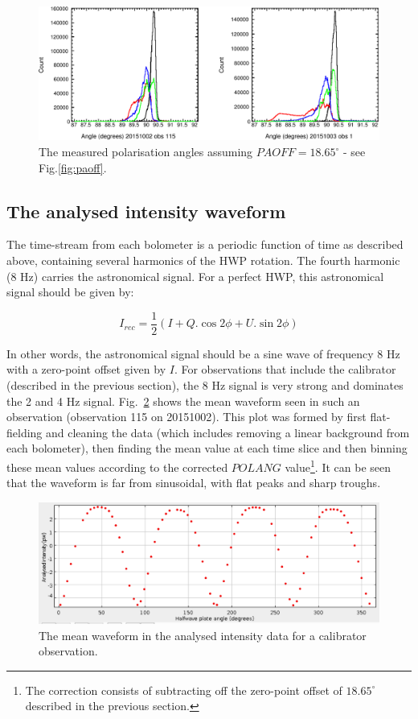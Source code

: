 \documentclass[twoside,11pt]{starlink}
\begin{document}
\begin{figure}
\includegraphics[width=\columnwidth]{paoff2}
\caption{The measured polarisation angles assuming $PAOFF=18.65^\circ$
- see Fig.\ref{fig:paoff}.}
\label{fig:paoff2}
\end{figure}

\subsection{The analysed intensity waveform}
\label{sec:wave}
The time-stream from each bolometer is a periodic function of time as
described above, containing several harmonics of the HWP rotation. The
fourth harmonic (8 Hz) carries the astronomical signal. For a perfect
HWP, this astronomical signal should be given by:

\[ I_{rec} = \frac{1}{2}( I + Q.\cos 2\phi + U.\sin 2\phi ) \]

In other words, the astronomical signal should be a sine wave of
frequency 8 Hz with a zero-point offset given by $I$. For observations
that include the calibrator (described in the previous section), the 8 Hz
signal is very strong and dominates the 2 and 4 Hz signal.
Fig.~\ref{fig:calib-wave} shows the mean waveform seen in such an
observation (observation 115 on 20151002). This plot was formed by
first flat-fielding and cleaning the data (which includes removing a
linear background from each bolometer), then finding the mean value
at each time slice and then binning these mean values according to
the corrected $POLANG$ value\footnote{The correction consists of
subtracting off the zero-point offset of $18.65^\circ$ described
in the previous section.}. It can be seen that the waveform is far
from sinusoidal, with flat peaks and sharp troughs.

\begin{figure}
\includegraphics[width=\columnwidth]{calib-wave}
\caption{The mean waveform in the analysed intensity data for a
calibrator observation.}
\label{fig:calib-wave}
\end{figure}
\end{document}
